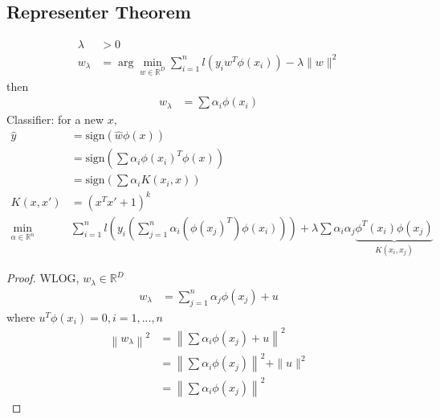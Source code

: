 \documentclass{article}
\begin{document}
\subsection{Representer Theorem}
\begin{align*}
\lambda &> 0
\\ w_{\lambda} &= \arg\displaystyle\min_{w \in \mathbb{R}^{D}} \displaystyle\sum_{i=1}^{n} l\left(y_{i} w^{T} \phi\left(x_{i}\right)\right) - \lambda \| w \|^{2}
\end{align*}
then
\begin{align*}
w_{\lambda} &= \displaystyle\sum \alpha_{i} \phi\left(x_{i}\right)
\end{align*}
Classifier: for a new $x, $
\begin{align*}
\hat{y} &= \text{sign}\left(\hat{w} \phi\left(x\right)\right)
\\ &= \text{sign}\left(\displaystyle\sum \alpha_{i} \phi\left(x_{i}\right)^{T} \phi\left(x\right)\right)
\\ &= \text{sign}\left(\displaystyle\sum \alpha_{i} K\left(x_{i}, x\right)\right)
\\ K\left(x, x'\right)  &= \left(x^{T} x' + 1\right)^{k}
\\ \displaystyle\min_{\alpha \in \mathbb{R}^{n}} &  \displaystyle\sum_{i=1}^{n} l\left(y_{i} \left(\displaystyle\sum_{j=1}^{n} \alpha_{i} \left(\phi\left(x_{j}\right)^{T}\right) \phi\left(x_{i}\right)\right)\right) + \lambda \displaystyle\sum \alpha_{i} \alpha_{j} \underbrace{ \phi^{T}\left(x_{i}\right) \phi\left(x_{j}\right) }_{K\left(x_{i}, x_{j}\right)}
\end{align*}
\begin{proof} \label{proof:rep} 
WLOG, $w_{\lambda} \in \mathbb{R}^{D}$
\begin{align*}
w_{\lambda} &= \displaystyle\sum_{j=1}^{n} \alpha_{j} \phi\left(x_{j}\right) + u 
\end{align*}
where $u^{T} \phi\left(x_{i}\right) = 0, i = 1, ..., n $
\begin{align*}
\left\| w_{\lambda} \right\|^{2} &= \left\| \displaystyle\sum \alpha_{i} \phi\left(x_{j}\right) + u \right\|^{2}
\\ &= \left\| \displaystyle\sum \alpha_{i} \phi\left(x_{j}\right) \right\|^{2} + \| u \|^{2}
\\ &= \left\| \displaystyle\sum \alpha_{i} \phi\left(x_{j}\right) \right\|^{2}
\end{align*}\end{proof}
\end{document}
